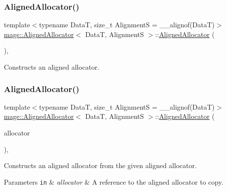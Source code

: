 \subsubsection{\texorpdfstring{Aligned\+Allocator()}{AlignedAllocator()}\hspace{0.1cm}{\footnotesize\ttfamily [1/4]}}
{\footnotesize\ttfamily template$<$typename DataT, size\+\_\+t AlignmentS = \+\_\+\+\_\+alignof(\+Data\+T)$>$ \\
\hyperlink{structmage_1_1_aligned_allocator}{mage\+::\+Aligned\+Allocator}$<$ DataT, AlignmentS $>$\+::\hyperlink{structmage_1_1_aligned_allocator}{Aligned\+Allocator} (\begin{DoxyParamCaption}{ }\end{DoxyParamCaption})\hspace{0.3cm}{\ttfamily [default]}, {\ttfamily [noexcept]}}

Constructs an aligned allocator. \hypertarget{structmage_1_1_aligned_allocator_a57a8626271cc5bb8798201afb499dce7}{}\label{structmage_1_1_aligned_allocator_a57a8626271cc5bb8798201afb499dce7} 
\subsubsection{\texorpdfstring{Aligned\+Allocator()}{AlignedAllocator()}\hspace{0.1cm}{\footnotesize\ttfamily [2/4]}}
{\footnotesize\ttfamily template$<$typename DataT, size\+\_\+t AlignmentS = \+\_\+\+\_\+alignof(\+Data\+T)$>$ \\
\hyperlink{structmage_1_1_aligned_allocator}{mage\+::\+Aligned\+Allocator}$<$ DataT, AlignmentS $>$\+::\hyperlink{structmage_1_1_aligned_allocator}{Aligned\+Allocator} (\begin{DoxyParamCaption}\item[{const \hyperlink{structmage_1_1_aligned_allocator}{Aligned\+Allocator}$<$ DataT, AlignmentS $>$ \&}]{allocator }\end{DoxyParamCaption})\hspace{0.3cm}{\ttfamily [default]}, {\ttfamily [noexcept]}}

Constructs an aligned allocator from the given aligned allocator.


\begin{DoxyParams}[1]{Parameters}
\mbox{\tt in}  & {\em allocator} & A reference to the aligned allocator to copy. \\
\hline
\end{DoxyParams}
\hypertarget{structmage_1_1_aligned_allocator_aa83ac0904d3354ed96a92f7ad713e1a7}{}\label{structmage_1_1_aligned_allocator_aa83ac0904d3354ed96a92f7ad713e1a7} 
